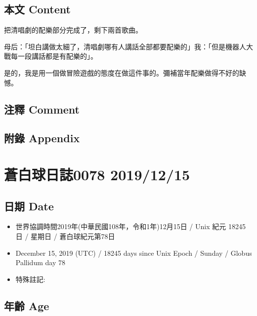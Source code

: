\documentclass[a5paper, 12pt
]{book}
\providecommand{\tightlist}{%
  \setlength{\itemsep}{0pt}\setlength{\parskip}{0pt}}
\begin{document}
\hypertarget{ux672cux6587-content-13}{%
\subsection{本文 Content}\label{ux672cux6587-content-13}}

把清唱劇的配樂部分完成了，剩下兩首歌曲。

母后：「坦白講做太細了，清唱劇哪有人講話全部都要配樂的」我：「但是機器人大戰每一段講話都是有配樂的」。

是的，我是用一個做冒險遊戲的態度在做這件事的。彌補當年配樂做得不好的缺憾。

\hypertarget{ux6ce8ux91cb-comment-12}{%
\subsection{注釋 Comment}\label{ux6ce8ux91cb-comment-12}}

\hypertarget{ux9644ux9304-appendix-13}{%
\subsection{附錄 Appendix}\label{ux9644ux9304-appendix-13}}

\hypertarget{ux84bcux767dux7403ux65e5ux8a8c0078-20191215}{%
\section{蒼白球日誌0078
2019/12/15}\label{ux84bcux767dux7403ux65e5ux8a8c0078-20191215}}

\hypertarget{ux65e5ux671f-date-14}{%
\subsection{日期 Date}\label{ux65e5ux671f-date-14}}

\begin{itemize}
\tightlist
\item
  世界協調時間2019年(中華民國108年，令和1年)12月15日 / Unix 紀元 18245
  日 / 星期日 / 蒼白球紀元第78日
\item
  December 15, 2019 (UTC) / 18245 days since Unix Epoch / Sunday /
  Globus Pallidum day 78
\item
  特殊註記:
\end{itemize}

\hypertarget{ux5e74ux9f61-age-14}{%
\subsection{年齡 Age}\label{ux5e74ux9f61-age-14}}
\end{document}
